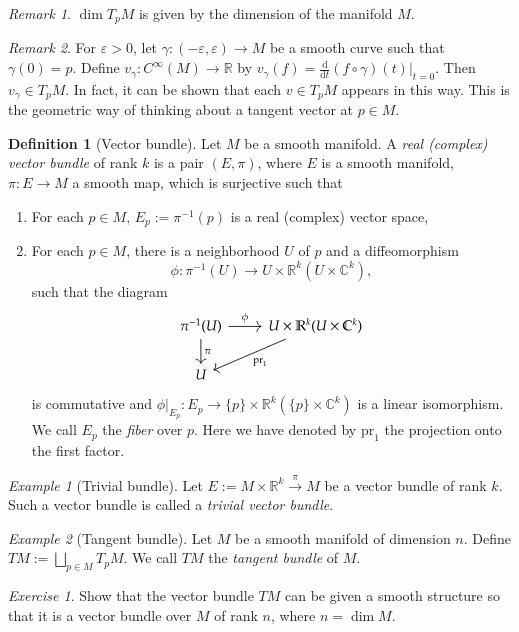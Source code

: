 \documentclass[11pt]{amsart}
\numberwithin{equation}{section}
\theoremstyle{plain}
\theoremstyle{definition}
\newtheorem{defn}{Definition}[subsection]
\theoremstyle{remark}
\newtheorem{rem}{Remark}[subsection]
\newtheorem{exe}{Exercise}[subsection]
\newtheorem{ex}{Example}[subsection]
\newcommand{\R}{\mathbb{R}}
\newcommand{\dd}{{\mathrm{d}}}
\begin{document}
\begin{rem}
$\dim T_pM$ is given by the dimension of the manifold $M$.
\end{rem}

\begin{rem}
For $\varepsilon>0$, let $\gamma\colon(-\varepsilon,\varepsilon)\to M$ be a smooth curve such that $\gamma(0)=p$. Define $v_\gamma\colon C^\infty(M)\to \R$ by $v_\gamma(f)=\frac{\dd}{\dd t}(f\circ \gamma)(t)\big|_{t=0}$. Then $v_\gamma\in T_pM$. In fact, it can be shown that each $v\in T_pM$ appears in this way. This is the geometric way of thinking about a tangent vector at $p\in M$.
\end{rem}

\begin{defn}[Vector bundle]
Let $M$ be a smooth manifold. A \emph{real (complex) vector bundle} of rank $k$ is a pair $(E,\pi)$, where $E$ is a smooth manifold, $\pi\colon E\to M$ a smooth map, which is surjective such that
\begin{enumerate}
\item{For each $p\in M$, $E_p:=\pi^{-1}(p)$ is a real (complex) vector space,}
\item{For each $p\in M$, there is a neighborhood $U$ of $p$ and a diffeomorphism
$$\phi\colon \pi^{-1}(U)\to U\times \R^k (U\times \mathbb{C}^k),$$
such that the diagram
\[
\begin{tikzcd}
\pi^{-1}(U)\arrow[d,"\pi"]\arrow[r,"\phi"]&U\times \R^k (U\times \mathbb{C}^k)\arrow[dl,"\mathrm{pr}_1"]\\
U&
\end{tikzcd}
\]
is commutative and $\phi\big|_{E_p}\colon E_p\to \{p\}\times\R^k (\{p\}\times\mathbb{C}^k)$ is a linear isomorphism. We call $E_p$ the \emph{fiber} over $p$. Here we have denoted by $\mathrm{pr}_1$ the projection onto the first factor.
}
\end{enumerate}
\end{defn}

\begin{ex}[Trivial bundle]
Let $E:=M\times \R^k\xrightarrow{\pi}M$ be a vector bundle of rank $k$. Such a vector bundle is called a \emph{trivial vector bundle}.
\end{ex}
\begin{ex}[Tangent bundle]
Let $M$ be a smooth manifold of dimension $n$. Define $TM:=\bigsqcup_{p\in M}T_pM$. We call $TM$ the \emph{tangent bundle} of $M$.
\end{ex}

\begin{exe}
Show that the vector bundle $TM$ can be given a smooth structure so that it is a vector bundle over $M$ of rank $n$, where $n=\dim M$. 
\end{exe}
\end{document}
